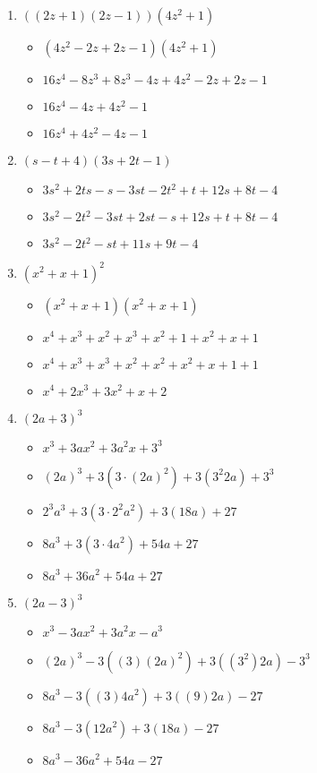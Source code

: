\documentclass{article}
\begin{document}
\begin{onehalfspace}
\begin{enumerate}
    \item $((2z + 1)(2z - 1))(4z^{2} + 1)$
    \begin{itemize}
        \item $(4z^{2} - 2z + 2z - 1)(4z^{2} + 1)$
        \item $16z^{4} - 8z^{3} + 8z^{3} - 4z + 4z^{2} - 2z + 2z - 1$
        \item $16z^{4} - 4z + 4z^{2} - 1$
        \item $16z^{4} + 4z^{2} - 4z - 1$
    \end{itemize}

    \item $(s - t + 4)(3s + 2t - 1)$
    \begin{itemize}
        \item $3s^{2} + 2ts - s - 3st - 2t^{2} + t + 12s + 8t - 4$
        \item $3s^{2} - 2t^{2} - 3st + 2st - s + 12s + t + 8t - 4$
        \item $3s^{2} - 2t^{2} - st + 11s + 9t - 4$
    \end{itemize}
    \item $(x^{2} + x + 1)^{2}$
    \begin{itemize}
        \item $(x^{2} + x + 1)(x^{2} + x + 1)$
        \item $x^{4} + x^{3} + x^{2} + x^{3} + x^{2} + 1 + x^{2} + x + 1$
        \item $x^{4} + x^{3} + x^{3} + x^{2} + x^{2} + x^{2} + x + 1 + 1$
        \item $x^{4} + 2x^{3} + 3x^{2} + x + 2$
    \end{itemize}
    
    \item $(2a + 3)^{3}$
    \begin{itemize}
        \item $x^{3} + 3ax^{2} + 3a^{2}x + 3^{3}$
        \item $(2a)^{3} + 3(3 \cdot (2a)^{2}) + 3(3^{2}2a) + 3^{3}$
        \item $2^{3}a^{3} + 3(3 \cdot 2^{2}a^{2}) + 3(18a) + 27$
        \item $8a^{3} + 3(3 \cdot 4a^{2}) + 54a + 27$
        \item $8a^{3} + 36a^{2} + 54a + 27$
    \end{itemize}
    
    \item $(2a - 3)^{3}$
    \begin{itemize}
        \item $x^{3} - 3ax^{2} + 3a^{2}x - a^{3}$
        \item $(2a)^{3} - 3((3)(2a)^{2}) + 3((3^{2})2a) - 3^{3}$
        \item $8a^{3} - 3((3)4a^{2}) + 3((9)2a) - 27$
        \item $8a^{3} - 3(12a^{2}) + 3(18a) - 27$
        \item $8a^{3} - 36a^{2} + 54a - 27$
    \end{itemize}
    

\end{enumerate}
\end{onehalfspace}
\end{document}
